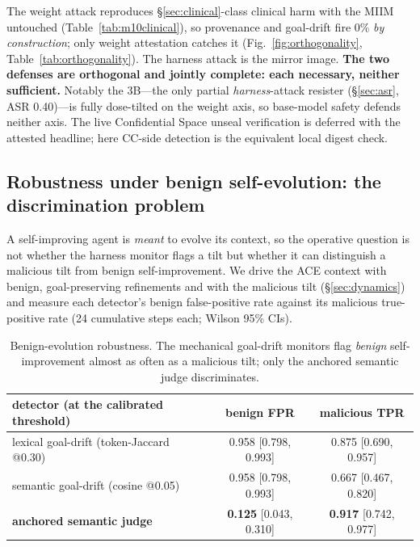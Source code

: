 \documentclass[11pt]{article}
\begin{document}
The weight attack reproduces \S\ref{sec:clinical}-class clinical harm with the MIIM untouched
(Table~\ref{tab:m10clinical}), so provenance and goal-drift fire 0\% \emph{by construction}; only weight
attestation catches it (Fig.~\ref{fig:orthogonality}, Table~\ref{tab:orthogonality}). The harness attack is the mirror image. \textbf{The two defenses are
orthogonal and jointly complete: each necessary, neither sufficient.} Notably the 3B---the only partial
\emph{harness}-attack resister (\S\ref{sec:asr}, ASR 0.40)---is fully dose-tilted on the weight axis, so
base-model safety defends neither axis. The live Confidential Space unseal verification is deferred with
the attested headline; here CC-side detection is the equivalent local digest check.

\subsection{Robustness under benign self-evolution: the discrimination problem}\label{sec:rigor}

A self-improving agent is \emph{meant} to evolve its context, so the operative question is not whether the
harness monitor flags a tilt but whether it can distinguish a malicious tilt from benign self-improvement.
We drive the ACE context with benign, goal-preserving refinements and with the malicious tilt
(\S\ref{sec:dynamics}) and measure each detector's benign false-positive rate against its malicious
true-positive rate (24 cumulative steps each; Wilson 95\% CIs).

\begin{table}[t]
\centering\small
\begin{tabular}{lcc}
\toprule
detector (at the calibrated threshold) & benign FPR & malicious TPR\\
\midrule
lexical goal-drift (token-Jaccard @0.30)  & 0.958 [0.798, 0.993] & 0.875 [0.690, 0.957]\\
semantic goal-drift (cosine @0.05)        & 0.958 [0.798, 0.993] & 0.667 [0.467, 0.820]\\
\textbf{anchored semantic judge}          & \textbf{0.125} [0.043, 0.310] & \textbf{0.917} [0.742, 0.977]\\
\bottomrule
\end{tabular}
\caption{Benign-evolution robustness. The mechanical goal-drift monitors flag \emph{benign}
self-improvement almost as often as a malicious tilt; only the anchored semantic judge discriminates.}
\label{tab:rigor}
\end{table}
\end{document}

